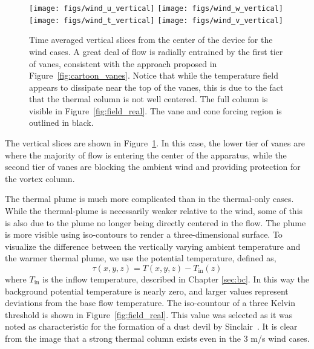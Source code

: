 %
%

\begin{figure}[htb]
  \centering
  \texttt{[image: figs/wind\_u\_vertical]}
  \hfill
  \texttt{[image: figs/wind\_w\_vertical]}
  \\
  \centering
  \texttt{[image: figs/wind\_t\_vertical]}
  \hfill
  \texttt{[image: figs/wind\_v\_vertical]}
  \\
 \caption{Time averaged vertical slices from the center of the device
 for the wind cases. A great deal of flow is radially entrained by the
 first tier of vanes, consistent with the approach proposed in
 Figure~\ref{fig:cartoon_vanes}. Notice that while the temperature field
  appears to dissipate near the top of the vanes, this is due to the
 fact that the thermal column is not well centered. The full column is
 visible in Figure~\ref{fig:field_real}. The vane and cone forcing region is
 outlined in black.}
 \label{fig:wind-ver}
\end{figure}

The vertical slices are shown in Figure~\ref{fig:wind-ver}. In this 
case, the lower tier of vanes are where the majority of flow is 
entering the center of the apparatus, while the second tier of vanes are
blocking the ambient wind and providing protection for the vortex column. 

The thermal plume is much more complicated than in the thermal-only
cases. While the thermal-plume is necessarily weaker relative to the
wind, some of this is also due to the plume no longer being directly
centered in the flow. The plume is more visible using iso-contours to
render a three-dimensional surface. 
To visualize the difference between the vertically varying ambient
temperature and the warmer thermal plume, we use the potential
temperature, defined as, 
\begin{equation}
  \tau(x,y,z) = T(x,y,z) -T_{\text{in}}(z) 
   \label{eqn:tau}
\end{equation}
where $T_{\text{in}}$ is the inflow temperature, described
in Chapter \ref{sec:bc}. In this way the background potential
temperature is nearly zero, and larger values represent deviations from
the base flow temperature. The iso-countour of a three Kelvin threshold
is  shown in Figure~\ref{fig:field_real}. This value was selected as
it was noted as characteristic for the formation of a dust devil by
Sinclair~\cite{Sinclair1969}. It is clear from the image that a 
strong thermal column exists even in the 3 m/s wind cases. 

